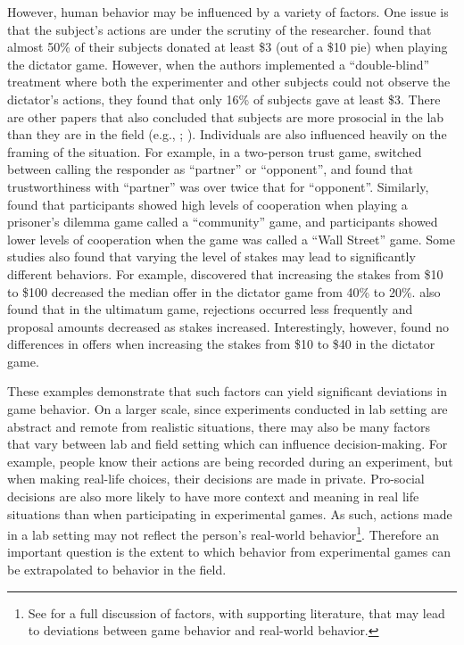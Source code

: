 \documentclass[12pt]{article}
\begin{document}
However, human behavior may be influenced by a variety of factors. One issue is that the subject\rq s actions are under the scrutiny of the researcher. \cite{hoffman_1994} found that almost 50\% of their subjects donated at least \$3 (out of a \$10 pie) when playing the dictator game. However, when the authors implemented a ``double-blind'' treatment where both the experimenter and other subjects could not observe the dictator\rq s actions, they found that only 16\% of subjects gave at least \$3. There are other papers that also concluded that subjects are more prosocial in the lab than they are in the field (e.g., \cite{list_2006}; \cite{gneezy_2004}). Individuals are also influenced heavily on the framing of the situation. For example, in a two-person trust game, \cite{burnham_mccabe_smith_2000} switched between calling the responder as ``partner'' or ``opponent'', and found that trustworthiness with ``partner'' was over twice that for ``opponent''. Similarly, \cite{ross_ward_1996} found that participants showed high levels of cooperation when playing a prisoner\rq s dilemma game called a ``community'' game, and participants showed lower levels of cooperation when the game was called a ``Wall Street'' game. Some studies also found that varying the level of stakes may lead to significantly different behaviors. For example, \cite{carpenter_verhoogen_burks_2005} discovered that increasing the stakes from \$10 to \$100 decreased the median offer in the dictator game from 40\% to 20\%. \cite{slonim_roth_1998} also found that in the ultimatum game, rejections occurred less frequently and proposal amounts decreased as stakes increased. Interestingly, however, \cite{cherry_frykblom_shogren_2002} found no differences in offers when increasing the stakes from \$10 to \$40 in the dictator game. 
 
These examples demonstrate that such factors can yield significant deviations in game behavior. On a larger scale, since experiments conducted in lab setting are abstract and remote from realistic situations, there may also be many factors that vary between lab and field setting which can influence decision-making. For example, people know their actions are being recorded during an experiment, but when making real-life choices, their decisions are made in private. Pro-social decisions are also more likely to have more context and meaning in real life situations than when participating in experimental games. As such, actions made in a lab setting may not reflect the person\rq s real-world behavior\footnote{See \cite{levitt_list_2007} for a full discussion of factors, with supporting literature, that may lead to deviations between game behavior and real-world behavior.}. Therefore an important question is the extent to which behavior from experimental games can be extrapolated to behavior in the field.
\end{document}
